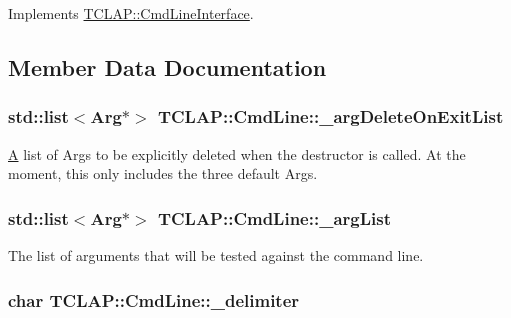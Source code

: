 Implements \hyperlink{class_t_c_l_a_p_1_1_cmd_line_interface_a6a94140e522bcf6104928fcf0c434ab8}{T\+C\+L\+A\+P\+::\+Cmd\+Line\+Interface}.



\subsection{Member Data Documentation}
\hypertarget{class_t_c_l_a_p_1_1_cmd_line_af8d37fbf9d0b60b6acbd737af380f3e5}{
\subsubsection[{\+\_\+arg\+Delete\+On\+Exit\+List}]{\setlength{\rightskip}{0pt plus 5cm}std\+::list$<${\bf Arg}$\ast$$>$ T\+C\+L\+A\+P\+::\+Cmd\+Line\+::\+\_\+arg\+Delete\+On\+Exit\+List\hspace{0.3cm}{\ttfamily [protected]}}}\label{class_t_c_l_a_p_1_1_cmd_line_af8d37fbf9d0b60b6acbd737af380f3e5}
\hyperlink{class_a}{A} list of Args to be explicitly deleted when the destructor is called. At the moment, this only includes the three default Args. \hypertarget{class_t_c_l_a_p_1_1_cmd_line_a4d70f73542d8184e077688bff3801baf}{
\subsubsection[{\+\_\+arg\+List}]{\setlength{\rightskip}{0pt plus 5cm}std\+::list$<${\bf Arg}$\ast$$>$ T\+C\+L\+A\+P\+::\+Cmd\+Line\+::\+\_\+arg\+List\hspace{0.3cm}{\ttfamily [protected]}}}\label{class_t_c_l_a_p_1_1_cmd_line_a4d70f73542d8184e077688bff3801baf}
The list of arguments that will be tested against the command line. \hypertarget{class_t_c_l_a_p_1_1_cmd_line_a602e65692dc07ea872134f354026a54f}{
\subsubsection[{\+\_\+delimiter}]{\setlength{\rightskip}{0pt plus 5cm}char T\+C\+L\+A\+P\+::\+Cmd\+Line\+::\+\_\+delimiter\hspace{0.3cm}{\ttfamily [protected]}}}\label{class_t_c_l_a_p_1_1_cmd_line_a602e65692dc07ea872134f354026a54f}
